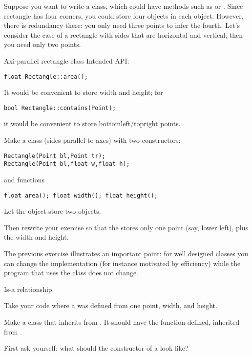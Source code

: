 Suppose you want to write a  class, which could have methods such as
 or .
Since rectangle has four corners, you could store four 
objects in each  object. However, there is redundancy
there: you only need three points to infer the fourth. Let's consider
the case of a rectangle with sides that are horizontal and vertical;
then you need only two points.

\begin{block}{Axi-parallel rectangle class}
  \label{ex:geom:rect}
  Intended API:
\begin{verbatim}
float Rectangle::area();
\end{verbatim}
It would be convenient to store width and height; for 
\begin{verbatim}
bool Rectangle::contains(Point);  
\end{verbatim}
it would be convenient to store bottomleft/topright points.
\end{block}

\begin{exercise}
  \label{ex:geom:rect2}
  Make a class  (sides parallel to axes) with two constructors:
\begin{verbatim}
Rectangle(Point bl,Point tr);
Rectangle(Point bl,float w,float h);
\end{verbatim}
  and functions
\begin{verbatim}
float area(); float width(); float height();
\end{verbatim}
  Let the  object store two  objects.

  Then rewrite your exercise so that the  stores only one
  point (say, lower left), plus the width and height.
\end{exercise}

The previous exercise illustrates an important point: for well
designed classes you can change the implementation (for instance motivated
by efficiency) while the program that uses the class does not change.

 {Is-a relationship}

\prerequisite{\ref{sec:inheritance}}

\begin{exercise}
  \label{ex:geom:square}
  Take your code where a  was defined from one point,
  width, and height.

  Make a class  that inherits from . It should
  have the function  defined, inherited from .

  First ask yourself: what should the constructor of a  look like?
\end{exercise}

